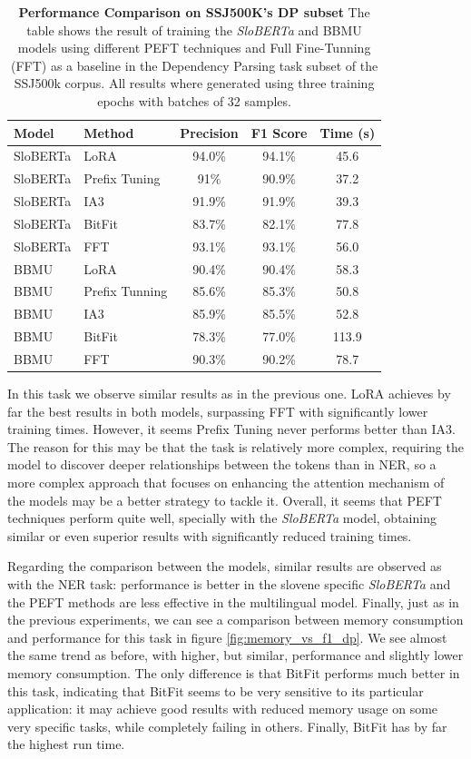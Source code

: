\documentclass[fleqn,moreauthors,10pt]{ds_report}
\begin{document}
\begin{table}[ht]
\centering
\caption{\textbf{Performance Comparison on SSJ500K's DP subset} The table shows the result of training the {\it SloBERTa} and BBMU models using different PEFT techniques and Full Fine-Tunning (FFT) as a baseline in the Dependency Parsing task subset of the SSJ500k corpus. All results where generated using three training epochs with batches of 32 samples.}
\label{tab:dependency_parsing-results}
\small
\begin{tabular}{@{}llccc@{}}
\toprule
Model & Method & Precision & F1 Score & Time (s)\\ \midrule
SloBERTa & LoRA & 94.0\% & 94.1\% & 45.6 \\
SloBERTa & Prefix Tuning & 91\% & 90.9\% & 37.2 \\
SloBERTa & IA3 & 91.9\% & 91.9\% & 39.3 \\
SloBERTa & BitFit & 83.7\% & 82.1\% & 77.8 \\
SloBERTa & FFT & 93.1\% & 93.1\% & 56.0 \\
BBMU & LoRA & 90.4\% & 90.4\% & 58.3 \\
BBMU & Prefix Tunning & 85.6\% & 85.3\% & 50.8 \\
BBMU & IA3 & 85.9\% & 85.5\% & 52.8 \\
BBMU & BitFit & 78.3\% & 77.0\% & 113.9 \\
BBMU & FFT & 90.3\% & 90.2\% & 78.7 \\
\bottomrule
\end{tabular}
\end{table}

In this task we observe similar results as in the previous one. LoRA achieves by far the best results in both models, surpassing FFT with significantly lower training times. However, it seems Prefix Tuning never performs better than IA3. The reason for this may be that the task is relatively more complex, requiring the model to discover deeper relationships between the tokens than in NER, so a more complex approach that focuses on enhancing the attention mechanism of the models may be a better strategy to tackle it. Overall, it seems that PEFT techniques perform quite well, specially with the \textit{SloBERTa} model, obtaining similar or even superior results with significantly reduced training times.

Regarding the comparison between the models, similar results are observed as with the NER task: performance is better in the slovene specific \textit{SloBERTa} and the PEFT methods are less effective in the multilingual model. Finally, just as in the previous experiments, we can see a comparison between memory consumption and performance for this task in figure \ref{fig:memory_vs_f1_dp}. We see almost the same trend as before, with higher, but similar, performance and slightly lower memory consumption. The only difference is that BitFit performs much better in this task, indicating that BitFit seems to be very sensitive to its particular application: it may achieve good results with reduced memory usage on some very specific tasks, while completely failing in others. Finally, BitFit has by far the highest run time.
\end{document}
